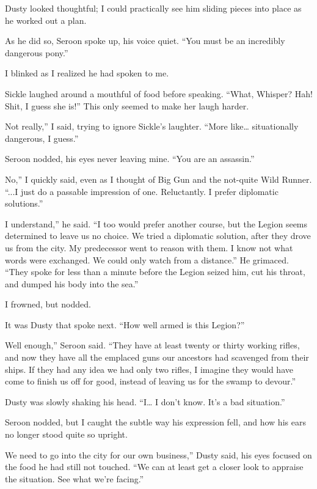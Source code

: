 Dusty looked thoughtful; I could practically see him sliding pieces into place as he worked out a plan.

As he did so, Seroon spoke up, his voice quiet. “You must be an incredibly dangerous pony.”

I blinked as I realized he had spoken to me.

Sickle laughed around a mouthful of food before speaking. “What, Whisper? Hah! Shit, I guess she is!” This only seemed to make her laugh harder.

\leavevmode{}Not really,” I said, trying to ignore Sickle’s laughter. “More like… situationally dangerous, I guess.”

Seroon nodded, his eyes never leaving mine. “You are an assassin.”

\leavevmode{}No,” I quickly said, even as I thought of Big Gun and the not-quite Wild Runner. “...I just do a passable impression of one. Reluctantly. I prefer diplomatic solutions.”

\leavevmode{}I understand,” he said. “I too would prefer another course, but the Legion seems determined to leave us no choice. We tried a diplomatic solution, after they drove us from the city. My predecessor went to reason with them. I know not what words were exchanged. We could only watch from a distance.” He grimaced. “They spoke for less than a minute before the Legion seized him, cut his throat, and dumped his body into the sea.”

I frowned, but nodded.

It was Dusty that spoke next. “How well armed is this Legion?”

\leavevmode{}Well enough,” Seroon said. “They have at least twenty or thirty working rifles, and now they have all the emplaced guns our ancestors had scavenged from their ships. If they had any idea we had only two rifles, I imagine they would have come to finish us off for good, instead of leaving us for the swamp to devour.”

Dusty was slowly shaking his head. “I… I don’t know. It’s a bad situation.”

Seroon nodded, but I caught the subtle way his expression fell, and how his ears no longer stood quite so upright.

\leavevmode{}We need to go into the city for our own business,” Dusty said, his eyes focused on the food he had still not touched. “We can at least get a closer look to appraise the situation. See what we’re facing.”

